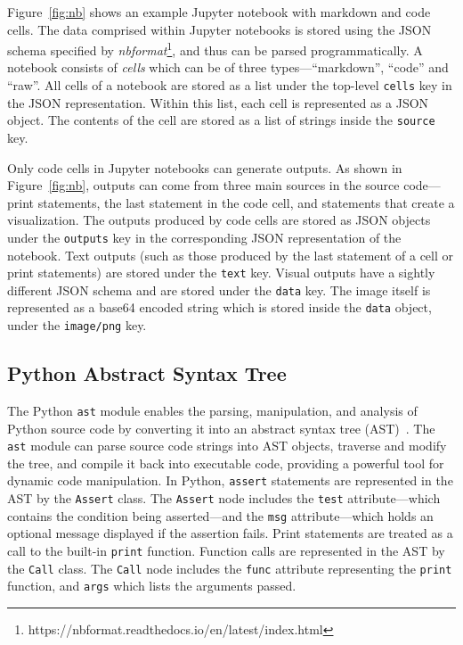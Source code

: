 Figure~\ref{fig:nb} shows an example Jupyter notebook with markdown and code cells. The data comprised within Jupyter notebooks is stored using the JSON schema specified by \emph{nbformat}\footnote{https://nbformat.readthedocs.io/en/latest/index.html}, and thus can be parsed programmatically. A notebook consists of \emph{cells} which can be of three types---``markdown'', ``code'' and ``raw''. All cells of a notebook are stored as a list under the top-level \lstinline[language={}]$cells$ key in the JSON representation. Within this list, each cell is represented as a JSON object. The contents of the cell are stored as a list of strings inside the \lstinline[language={}]$source$ key.

Only code cells in Jupyter notebooks can generate outputs. As shown in Figure~\ref{fig:nb}, outputs can come from three main sources in the source code---print statements, the last statement in the code cell, and statements that create a visualization. The outputs produced by code cells are stored as JSON objects under the \lstinline[language={}]$outputs$ key in the corresponding JSON representation of the notebook. Text outputs (such as those produced by the last statement of a cell or print statements) are stored under the \lstinline[language={}]$text$ key. Visual outputs have a sightly different JSON schema and are stored under the \lstinline[language={}]$data$ key. The image itself is represented as a base64 encoded string which is stored inside the \lstinline[language={}]$data$ object, under the \lstinline[language={}]$image/png$ key.

\subsection{Python Abstract Syntax Tree}

The Python \lstinline{ast} module enables the parsing, manipulation, and analysis of Python source code by converting it into an abstract syntax tree (AST)~\cite{pythonast}. The \lstinline{ast} module can parse source code strings into AST objects, traverse and modify the tree, and compile it back into executable code, providing a powerful tool for dynamic code manipulation. In Python, \lstinline{assert} statements are represented in the AST by the \lstinline{Assert} class. The \lstinline{Assert} node includes the \lstinline{test} attribute---which contains the condition being asserted---and the \lstinline{msg} attribute---which holds an optional message displayed if the assertion fails. Print statements are treated as a call to the built-in \lstinline{print} function. Function calls are represented in the AST by the \lstinline{Call} class. The \lstinline{Call} node includes the \lstinline{func} attribute representing the \lstinline{print} function, and \lstinline{args} which lists the arguments passed.

